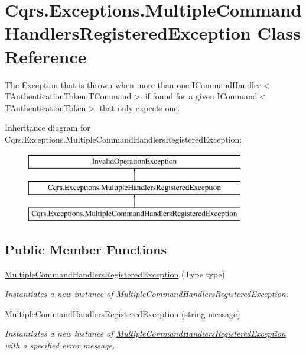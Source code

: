 \hypertarget{classCqrs_1_1Exceptions_1_1MultipleCommandHandlersRegisteredException}{}\section{Cqrs.\+Exceptions.\+Multiple\+Command\+Handlers\+Registered\+Exception Class Reference}
\label{classCqrs_1_1Exceptions_1_1MultipleCommandHandlersRegisteredException}


The Exception that is thrown when more than one I\+Command\+Handler$<$\+T\+Authentication\+Token,\+T\+Command$>$ if found for a given I\+Command$<$\+T\+Authentication\+Token$>$ that only expects one.  


Inheritance diagram for Cqrs.\+Exceptions.\+Multiple\+Command\+Handlers\+Registered\+Exception\+:\begin{figure}[H]
\begin{center}
\leavevmode
\includegraphics[height=3.000000cm]{classCqrs_1_1Exceptions_1_1MultipleCommandHandlersRegisteredException}
\end{center}
\end{figure}
\subsection*{Public Member Functions}
\begin{DoxyCompactItemize}
\item 
\hyperlink{classCqrs_1_1Exceptions_1_1MultipleCommandHandlersRegisteredException_aa8e0bffc3404b091301abaec4c770aa6_aa8e0bffc3404b091301abaec4c770aa6}{Multiple\+Command\+Handlers\+Registered\+Exception} (Type type)
\begin{DoxyCompactList}\small\item\em Instantiates a new instance of \hyperlink{classCqrs_1_1Exceptions_1_1MultipleCommandHandlersRegisteredException}{Multiple\+Command\+Handlers\+Registered\+Exception}. \end{DoxyCompactList}\item 
\hyperlink{classCqrs_1_1Exceptions_1_1MultipleCommandHandlersRegisteredException_aa3457b26ff5ab06b6b6762578fce5f67_aa3457b26ff5ab06b6b6762578fce5f67}{Multiple\+Command\+Handlers\+Registered\+Exception} (string message)
\begin{DoxyCompactList}\small\item\em Instantiates a new instance of \hyperlink{classCqrs_1_1Exceptions_1_1MultipleCommandHandlersRegisteredException}{Multiple\+Command\+Handlers\+Registered\+Exception} with a specified error message. \end{DoxyCompactList}\end{DoxyCompactItemize}
